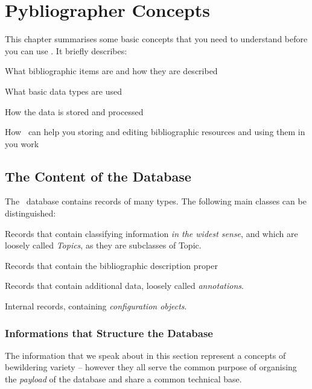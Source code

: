 
\chapter{Pybliographer Concepts}
\label{cha:rgconc}

This chapter summarises some basic concepts that you need to
understand before you can use \Pyb.
It briefly describes:
\begin{itemize*}
\item What bibliographic items are and how they are described
\item What basic data types are used 
\item How the data is stored and processed
\item How \Pyb\ can help you storing and editing bibliographic
  resources and using them in you work
\end{itemize*}


\section{The Content of the Database}
\label{sec:rgccont}

The \Pyb\ database contains records of many types.  The following main
classes can be distinguished: 
\begin{itemize*}
\item Records that contain classifying information \textit{in the
    widest sense}, and which are loosely called \textsf{\itshape
    Topics}, as they are subclasses of \textsf{Topic}.
\item Records that contain the bibliographic description proper
\item Records that contain additional data, loosely called
  \textit{annotations}.
\item Internal records, containing \textit{configuration objects}.
\end{itemize*}



\subsection{Informations that Structure the Database}
\label{sec:rgconctopic}

The information that we speak about in this section represent a
concepts of bewildering variety -- however they all serve the common
purpose of organising the \textit{payload} of the database and share a
common technical base.

